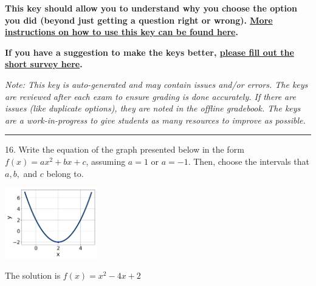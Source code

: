 \documentclass{extbook}[14pt]
\begin{document}
\textbf{This key should allow you to understand why you choose the option you did (beyond just getting a question right or wrong). \href{https://xronos.clas.ufl.edu/mac1105spring2020/courseDescriptionAndMisc/Exams/LearningFromResults}{More instructions on how to use this key can be found here}.}

\textbf{If you have a suggestion to make the keys better, \href{https://forms.gle/CZkbZmPbC9XALEE88}{please fill out the short survey here}.}

\textit{Note: This key is auto-generated and may contain issues and/or errors. The keys are reviewed after each exam to ensure grading is done accurately. If there are issues (like duplicate options), they are noted in the offline gradebook. The keys are a work-in-progress to give students as many resources to improve as possible.}

\rule{\textwidth}{0.4pt}

16. Write the equation of the graph presented below in the form $f(x)=ax^2+bx+c$, assuming  $a=1$ or $a=-1$. Then, choose the intervals that $a, b,$ and $c$ belong to.
\begin{center} \includegraphics[width=0.3\textwidth]{../Figures/quadraticGraphToEquationA.png} \end{center} 

The solution is $ f(x) = x^{2} -4 x + 2 $ 
\end{document}
